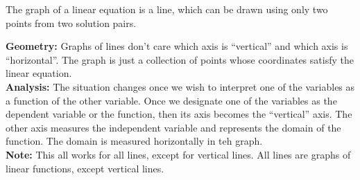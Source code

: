 \documentclass{ximera}
\begin{document}
\begin{example}
\begin{image}
\end{image}

The graph of a linear equation is a line, which can be drawn using only two points from two solution pairs.














\end{example}

\textbf{\textcolor{purple!85!blue}{Geometry:}} Graphs of lines don't care which axis is ``vertical'' and which axis is ``horizontal''.  The graph is just a collection of points whose coordinates satisfy the linear equation.  \\
\textbf{\textcolor{purple!85!blue}{Analysis:}} The situation changes once we wish to interpret one of the variables as a function of the other variable. Once we designate one of the variables as the dependent variable or the function, then its axis becomes the ``vertical'' axis.  The other axis measures the independent variable and represents the domain of the function. The domain is measured horizontally in teh graph. \\


\textbf{Note:} This all works for all lines, except for vertical lines. All lines are graphs of linear functions, except vertical lines. \\
\end{document}
